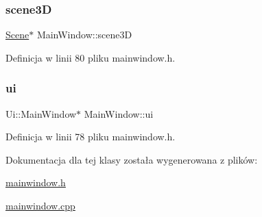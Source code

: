 \mbox{\label{class_main_window_a3c6e8f3b032c72151f1e871e26d33fcb}} 
\subsubsection{\texorpdfstring{scene3D}{scene3D}}
{\footnotesize\ttfamily \hyperlink{class_scene}{Scene}$\ast$ Main\+Window\+::scene3D\hspace{0.3cm}{\ttfamily [private]}}



Definicja w linii 80 pliku mainwindow.\+h.

\mbox{\label{class_main_window_a35466a70ed47252a0191168126a352a5}} 
\subsubsection{\texorpdfstring{ui}{ui}}
{\footnotesize\ttfamily Ui\+::\+Main\+Window$\ast$ Main\+Window\+::ui\hspace{0.3cm}{\ttfamily [private]}}



Definicja w linii 78 pliku mainwindow.\+h.



Dokumentacja dla tej klasy została wygenerowana z plików\+:\begin{DoxyCompactItemize}
\item 
\hyperlink{mainwindow_8h}{mainwindow.\+h}\item 
\hyperlink{mainwindow_8cpp}{mainwindow.\+cpp}\end{DoxyCompactItemize}
